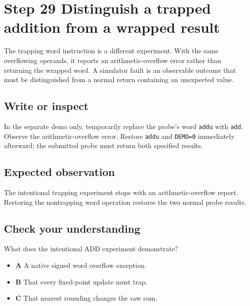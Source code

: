 \section{Step 29 Distinguish a trapped addition from a wrapped result}\label{ball-s29}

The trapping word instruction is a different experiment. With the same overflowing operands, it reports an arithmetic-overflow error rather than returning the wrapped word. A simulator fault is an observable outcome that must be distinguished from a normal return containing an unexpected value.

\subsection{Write or inspect}
In the separate demo only, temporarily replace the probe’s word \texttt{addu} with \texttt{add}. Observe the arithmetic-overflow error. Restore \texttt{addu} and \texttt{DEMO=0} immediately afterward; the submitted probe must return both specified results.

\subsection{Expected observation}
The intentional trapping experiment stops with an arithmetic-overflow report. Restoring the nontrapping word operation restores the two normal probe results.

\subsection{Check your understanding}
What does the intentional ADD experiment demonstrate?

\begin{itemize}
  \item \textbf{A} A native signed word overflow exception.
  \item \textbf{B} That every fixed-point update must trap.
  \item \textbf{C} That nearest rounding changes the raw sum.
\end{itemize}
